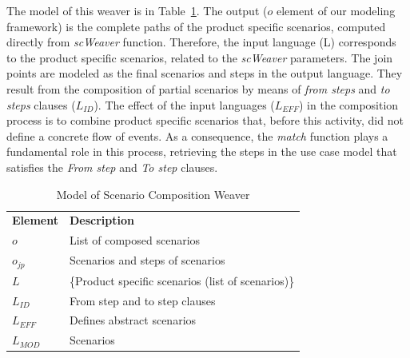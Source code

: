 \documentclass{acm_proc_article-sp}
\begin{document}
%
%

The model of this weaver is in Table~\ref{tab:sc-weaver}. The output ($o$ element of our modeling framework) is the complete paths of the product specific scenarios, computed directly from \emph{scWeaver} function. Therefore, the input language (L) corresponds to the product specific scenarios, related to the \emph{scWeaver}
 parameters.
The join points are modeled as the final scenarios and steps in the output language. They result from the composition of partial scenarios by means of
\emph{from steps} and \emph{to steps} clauses ($L_{ID}$).
The effect of the input languages ($L_{EFF}$) in the composition process is to combine
product specific scenarios that, before this activity, did not define a concrete flow of events. As a consequence, the \emph{match} function
plays a fundamental role in this process, retrieving the steps in the use case model that satisfies the \emph{From step} and \emph{To step} clauses.

\begin{table}[hbt]
\begin{center}
\caption{Model of Scenario Composition Weaver} \label{tab:sc-weaver}
\begin{tabular}{p{0.4in}p{2.6in}}
   \hline\noalign{\smallskip}
  {\bf Element} & {\bf Description} \\
   \noalign{\smallskip}
   \hline
   \noalign{\smallskip}
   $o$               & List of composed scenarios  \\
   $o_{jp}$        & Scenarios and steps of scenarios \\
   $L$               & \{Product specific scenarios (list of scenarios)\} \\
   $L_{ID}$       & From step and to step clauses \\
   $L_{EFF}$    & Defines abstract scenarios  \\
   $L_{MOD}$  &  Scenarios \\
  \hline
  \end{tabular}
\end{center}
\end{table}
\end{document}
